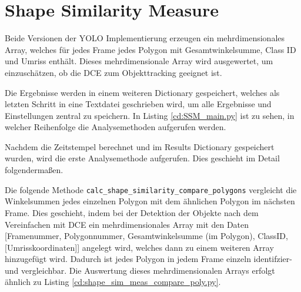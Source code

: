 \section{Shape Similarity Measure}{
	\label{py:Shape_Sim_Meas}
	Beide Versionen der YOLO Implementierung erzeugen ein mehrdimensionales Array, welches für jedes Frame jedes Polygon mit Gesamtwinkelsumme, Class ID und Umriss enthält. Dieses mehrdimensionale Array wird ausgewertet, um einzuschätzen, ob die DCE zum Objekttracking geeignet ist. 

	Die Ergebnisse werden in einem weiteren Dictionary gespeichert, welches als letzten Schritt in eine Textdatei geschrieben wird, um alle Ergebnisse und Einstellungen zentral zu speichern. In Listing \ref{cd:SSM_main.py} ist zu sehen, in welcher Reihenfolge die Analysemethoden aufgerufen werden. 
	
	Nachdem die Zeitstempel berechnet und im Results Dictionary gespeichert wurden, wird die erste Analysemethode aufgerufen. Dies geschieht im Detail folgendermaßen.

	Die folgende Methode \lstinline|calc_shape_similarity_compare_polygons| vergleicht die Winkelsummen jedes einzelnen Polygon mit dem ähnlichen Polygon im nächsten Frame. Dies geschieht, indem bei der Detektion der Objekte nach dem Vereinfachen mit DCE ein mehrdimensionales Array mit den Daten [Framenummer, Polygonnummer, Gesamtwinkelsumme (im Polygon), ClassID, [Umrisskoordinaten]] angelegt wird, welches dann zu einem weiteren Array hinzugefügt wird. Dadurch ist jedes Polygon in jedem Frame einzeln identifzier- und vergleichbar. 
	Die Auswertung dieses mehrdimensionalen Arrays erfolgt ähnlich zu Listing \ref{cd:shape_sim_meas_compare_poly.py}.\\

}
